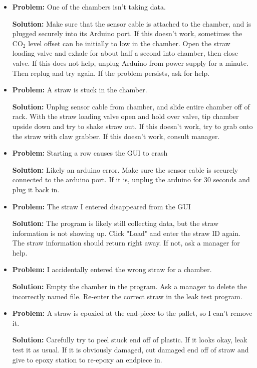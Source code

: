 \documentclass[letterpaper,12pt]{article}
\begin{document}
\begin{itemize}
	\item {\bf Problem:} One of the chambers isn't taking data.
		\begin{adjustwidth}{1cm}{}
		{\bf Solution:} Make sure that the sensor cable is attached to the chamber, and is plugged securely into its Arduino port. If this doesn't work, sometimes the CO$_2$ level offset can be initially to low in the chamber. Open the straw loading valve and exhale for about half a second into chamber, then close valve. If this does not help, unplug Arduino from power supply for a minute. Then replug and try again. If the problem persists, ask for help.
		\end{adjustwidth}
\item {\bf Problem:} A straw is stuck in the chamber.
		\begin{adjustwidth}{1cm}{}
		{\bf Solution:} Unplug sensor cable from chamber, and slide entire chamber off of rack. With the straw loading valve open and hold over valve, tip chamber upside down and try to shake straw out. If this doesn't work, try to grab onto the straw with claw grabber. If this doesn't work, consult manager.
		\end{adjustwidth}
        \item {\bf Problem:} Starting a row causes the GUI to crash
		\begin{adjustwidth}{1cm}{}
		{\bf Solution:} Likely an arduino error.  Make sure the sensor cable is securely connected to the arduino port.  If it is, unplug the arduino for 30 seconds and plug it back in.
		\end{adjustwidth}
        \item {\bf Problem:} The straw I entered disappeared from the GUI
		\begin{adjustwidth}{1cm}{}
		{\bf Solution:} The program is likely still collecting data, but the straw information is not showing up.  Click "Load" and enter the straw ID again.  The straw information should return right away.  If not, ask a manager for help.
		\end{adjustwidth}
	\item {\bf Problem:} I accidentally entered the wrong straw for a chamber.
		\begin{adjustwidth}{1cm}{}
		{\bf Solution:} Empty the chamber in the program. Ask a manager to delete the incorrectly named file. Re-enter the correct straw in the leak test program.
		\end{adjustwidth}
\item {\bf Problem:} A straw is epoxied at the end-piece to the pallet, so I can't remove it.
		\begin{adjustwidth}{1cm}{}
		{\bf Solution:} Carefully try to peel stuck end off of plastic. If it looks okay, leak test it as usual. If it is obviously damaged, cut damaged end off of straw and give to epoxy station to re-epoxy an endpiece in.
		\end{adjustwidth}
		

\end{itemize}
\end{document}
